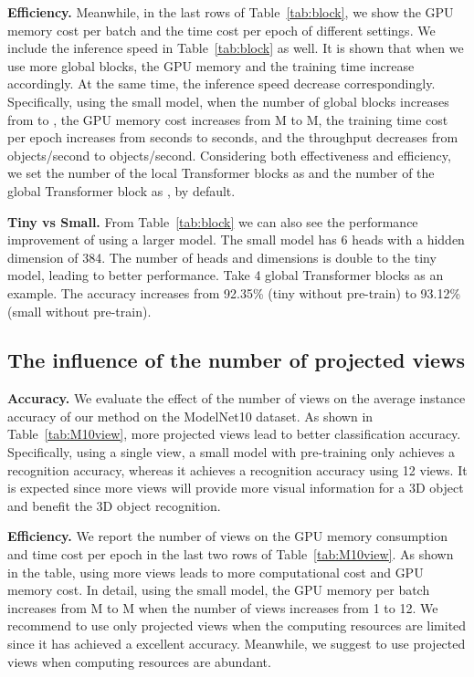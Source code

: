 \documentclass{bmvc2k}
\begin{document}
\noindent \textbf{Efficiency.} Meanwhile, in the last rows of Table~\ref{tab:block}, we show the GPU memory cost per batch and the time cost per epoch of different settings. We include the inference speed in Table~\ref{tab:block} as well. It is shown that when we use more global blocks, the GPU memory and the training time increase accordingly. At the same time, the inference speed decrease correspondingly. Specifically, using the small model, when the number of global blocks increases from  to , the GPU memory cost increases from M to M, the training time cost per epoch increases from  seconds to  seconds, and the throughput decreases from  objects/second to  objects/second.
Considering both effectiveness and efficiency, we set the number of the local Transformer blocks as  and the number of the global Transformer block as , by default.

\vspace{0.1in}
\noindent \textbf{Tiny vs Small.} From Table~\ref{tab:block} we can also see the performance improvement of using a larger model. The small model has 6 heads with a hidden dimension of 384. The number of heads and dimensions is double to the tiny model, leading to better performance. Take 4 global Transformer blocks as an example. The accuracy increases from 92.35\% (tiny without pre-train) to 93.12\% (small without pre-train).

\subsection{The influence of the number of projected views}
\textbf{Accuracy.} We evaluate the effect of the number of views on the average instance accuracy of our method on the ModelNet10 dataset.
As shown in Table~\ref{tab:M10view}, more projected views lead to better classification accuracy. 
Specifically, using a single view, a small model with pre-training only achieves a  recognition accuracy, whereas it achieves a  recognition accuracy using 12 views. 
It is expected since more views will provide more visual information for a 3D object and benefit the 3D object recognition. 


\vspace{0.1in}
\noindent \textbf{Efficiency.} We report the number of views on the GPU memory consumption and time cost per epoch in the last two rows of Table~\ref{tab:M10view}. As shown in the table,  using more views leads to  more computational cost and GPU memory cost. In detail, using the small model, the GPU memory per batch increases from M to M when the number of views increases from 1 to 12. We recommend to use only  projected views when the computing resources are limited since it has achieved a excellent accuracy. Meanwhile, we suggest to use  projected  views when computing resources are abundant.
\end{document}
